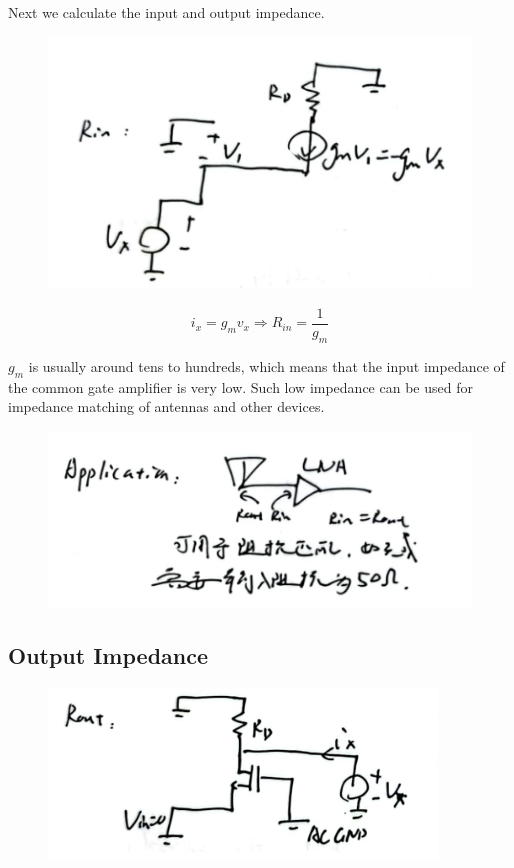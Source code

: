 \documentclass[fontset=windows]{article}
\begin{document}
Next we calculate the input and output impedance. 

\begin{figure}[htbp]
    \centering
    \includegraphics[scale=0.8]{3.jpg}
    \captionsetup{labelformat=empty}
    \caption{}
    \label{3}
\end{figure}

$$i_x=g_mv_x\Longrightarrow R_{in}=\frac{1}{g_m}$$

$g_m$ is usually around tens to hundreds, which means that the input impedance of the common gate amplifier is very low. 
Such low impedance can be used for impedance matching of antennas and other devices. 

\begin{figure}[htbp]
    \centering
    \includegraphics[scale=0.8]{4.jpg}
    \captionsetup{labelformat=empty}
    \caption{}
    \label{4}
\end{figure}

\subsection*{Output Impedance}

\begin{figure}[htbp]
    \centering
    \includegraphics[scale=0.8]{5.jpg}
    \captionsetup{labelformat=empty}
    \caption{}
    \label{5}
\end{figure}
\end{document}
